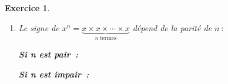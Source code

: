 \documentclass[10pt]{article}
\newtheorem{exo}{Exercice}
\begin{document}
\begin{exo}
\begin{enumerate}
\begin{multicols}{2}
\begin{center}
\end{center}

\end{multicols}

\medskip

On termine avec le tableau de $x^3.$ \`A nouveau, il y a deux méthodes~: soit on écrit $x^3=x\times x\times x,$ soit on se pose la question de savoir le signe de $x^3$ lorsque $x>0$ et lorsque $x<0.$ Par exemple, si $x<0,$ alors $x^3<0,$ puisque \og $\text{\textcircled{$-$}} \times\text{\textcircled{$-$}} \times\text{\textcircled{$-$}} =\text{\textcircled{$-$}}$ \fg.

Quelle que soit la méthode, on obtient le tableau~:

\begin{center}
\end{center}



\item Le signe de $x^n=\underbrace{x\times x\times\cdots \times x}_{n~\text{termes}}$ dépend de la parité de $n~:$


\setlength{\columnseprule}{1pt}

\begin{multicols}{2}

\textbf{Si n est pair~:}

\begin{center}
\end{center}

\columnbreak

\textbf{Si n est impair~:}

\begin{center}
\end{center}

\end{multicols}
 
\end{enumerate}

\end{exo}
\end{document}
